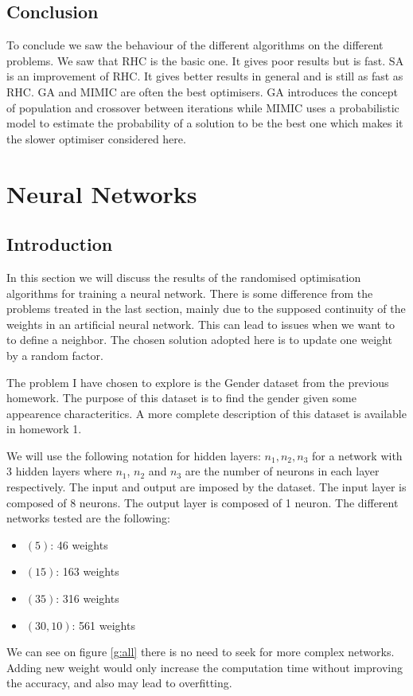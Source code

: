 \documentclass[twocolumn, 10pt]{article}
\begin{document}
		\subsection*{Conclusion}
			To conclude we saw the behaviour of the different algorithms on the different problems. We saw that RHC is the basic one. It gives poor results but is fast. SA is an improvement of RHC. It gives better results in general and is still as fast as RHC. GA and MIMIC are often the best optimisers. GA introduces the concept of population and crossover between iterations while MIMIC uses a probabilistic model to estimate the probability of a solution to be the best one which makes it the slower optimiser considered here.
	\section{Neural Networks}
		\subsection*{Introduction}
			In this section we will discuss the results of the randomised optimisation algorithms for training a neural network. There is some difference from the problems treated in the last section, mainly due to the supposed continuity of the weights in an artificial neural network. This can lead to issues when we want to to define a neighbor. The chosen solution adopted here is to update one weight by a random factor.

			The problem I have chosen to explore is the Gender dataset from the previous homework. The purpose of this dataset is to find the gender given some appearence characteritics. A more complete description of this dataset is available in homework 1.

			We will use the following notation for hidden layers: $n_1, n_2, n_3$ for a network with 3 hidden layers where $n_1$, $n_2$ and $n_3$ are the number of neurons in each layer respectively. The input and output are imposed by the dataset. The input layer is composed of 8 neurons. The output layer is composed of 1 neuron. The different networks tested are the following:
			\begin{itemize}
				\item $(5)$: 46 weights
				\item $(15)$: 163 weights
				\item $(35)$: 316 weights
				\item $(30,10)$: 561 weights
			\end{itemize}
			We can see on figure \ref{g:all} there is no need to seek for more complex networks.
			Adding new weight would only increase the computation time without improving the accuracy, and also may lead to overfitting.
\end{document}
